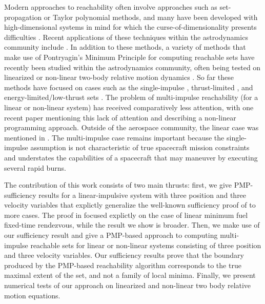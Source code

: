 \documentclass[letterpaper, 10 pt, conference]{ieeeconf}  %
\begin{document}
Modern approaches to reachability often involve approaches such as set-propagation or Taylor polynomial methods, and many have been developed with high-dimensional systems in mind for which the curse-of-dimensionality presents difficulties \cite{althoff2021, leguernic2010}. 
Recent applications of these techniques within the astrodynamics community include \cite{foss2026reachability, zhou2025single}. In addition to these methods, a variety of methods that make use of Pontryagin's Minimum Principle for computing reachable sets have recently been studied within the astrodynamics community, often being tested on linearized or non-linear two-body relative motion dynamics \cite{lee2018reachable, gong2020pursuit, natherson-2-2024}. 
So far these methods have focused on cases such as the single-impulse \cite{zhou2025single}, thrust-limited \cite{gong2020pursuit}, and energy-limited/low-thrust sets \cite{lee2018reachable, natherson-2-2024,natherson2024}. The problem of multi-impulse reachability (for a linear or non-linear system) has received comparatively less attention, with one recent paper \cite{Zhang2025} mentioning this lack of attention and describing a non-linear programming approach. Outside of the aerospace community, the linear case was mentioned in \cite{Medina2007}.
The multi-impulse case remains important because the single-impulse assumption is not characteristic of true spacecraft mission constraints and understates the capabilities of a spacecraft that may maneuver by executing several rapid burns. 

The contribution of this work consists of two main thrusts: first, we give PMP-sufficiency results for a linear-impulsive system with three position and three velocity variables that explictly generalize the well-known sufficiency proof of \cite{Prussing1995} to more cases. The proof in \cite{Prussing1995} focused explictly on the case of linear minimum fuel fixed-time rendezvous, while the result we show is broader. Then, we make use of our sufficiency result and give a PMP-based approach to computing multi-impulse reachable sets for linear or non-linear systems consisting of three position and three velocity variables. Our sufficiency results prove that the boundary produced by the PMP-based reachability algorithm corresponds to the true maximal extent of the set, and not a family of local minima. 
Finally, we present numerical tests of our approach on linearized and non-linear two body relative motion equations.
\end{document}
